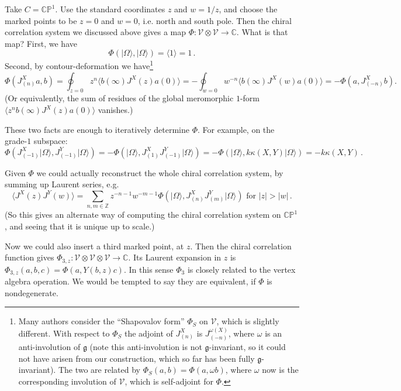 \documentclass[12pt,letterpaper,reqno]{amsart}
\numberwithin{equation}{section}
\newcommand{\fg}{{\mathfrak g}}
\newcommand{\bbC}{\ensuremath{\mathbb C}}
\newcommand{\bbP}{\ensuremath{\mathbb P}}
\newcommand{\bbZ}{\ensuremath{\mathbb Z}}
\newcommand\vac{{|\Omega\rangle}}
\newcommand{\vertex}{\mathcal{V}}
\newcommand{\abs}[1]{\lvert#1\rvert}
\newcommand{\IP}[1]{\langle#1\rangle}
\begin{document}
\begin{example}
Take $C = \bbC\bbP^1$. Use the standard
coordinates $z$ and $w = 1/z$, and choose the marked points
to be $z = 0$ and $w = 0$, i.e. north and south pole.
Then the chiral correlation system we discussed above 
gives a map 
$\Phi: \vertex \otimes \vertex \to \bbC$. What is that map?
First, we have 
\begin{equation}
 \Phi(\vac, \vac) = \IP{1} = 1 \, . 
\end{equation}
Second, by contour-deformation we have\footnote{Many authors consider the ``Shapovalov form'' 
$\Phi_S$ on $\vertex$, which is slightly different.
With respect to $\Phi_S$ the adjoint of $J^X_{(n)}$ is $J^{\omega(X)}_{(-n)}$, where $\omega$ is an anti-involution of $\fg$ (note this anti-involution is not $\fg$-invariant, so it could not have arisen from our construction, which so far
has been fully $\fg$-invariant). The two are related by
$\Phi_S(a,b) = \Phi(a,\omega b)$, where $\omega$ now is the 
corresponding involution of $\vertex$, which is
self-adjoint for $\Phi$.}
\begin{equation}
\Phi(J^X_{(n)} a, b) = \oint_{z=0} z^n \IP{b(\infty) J^X(z) a(0)} = - \oint_{w=0} w^{-n} \IP{b(\infty) J^X(w) a(0)} = - \Phi(a, J^X_{(-n)} b).
\end{equation}
(Or equivalently, the sum of residues of the global meromorphic $1$-form $\IP{z^n b(\infty) J^X(z) a(0)}$ vanishes.)

These two facts are enough to iteratively determine $\Phi$.
For example, on the grade-$1$ subspace:
\begin{equation}
  \Phi(J^X_{(-1)} \vac, J^Y_{(-1)} \vac) = -\Phi(\vac, J^X_{(1)} J^Y_{(-1)} \vac) = -\Phi(\vac, k \kappa (X,Y) \vac) = -k \kappa(X,Y) \, .
\end{equation}

Given $\Phi$ we could actually reconstruct the 
whole chiral correlation system, by summing up Laurent
series, e.g.
\begin{equation}
  \IP{J^X(z) J^Y(w)} = \sum_{n,m \in \bbZ} z^{-n-1} w^{-m-1} \Phi(\vac, J^X_{(n)} J^Y_{(m)} \vac) \text{ for } \abs{z} > \abs{w} \, . 
\end{equation}
(So this gives an alternate way of computing
the chiral correlation system on $\bbC \bbP^1$, 
and seeing that it is unique up to scale.)

Now we could also insert a third marked point, at
$z$. Then the chiral correlation function
gives $\Phi_{3,z}: \vertex \otimes \vertex \otimes \vertex \to \bbC$.
Its Laurent expansion in $z$ is
$\Phi_{3,z}(a,b,c) = \Phi(a, Y(b,z) c)$.
In this sense $\Phi_3$ is closely related to the
vertex algebra operation. We would be tempted to say they
are equivalent, if $\Phi$ is nondegenerate.


\end{example}
\end{document}

